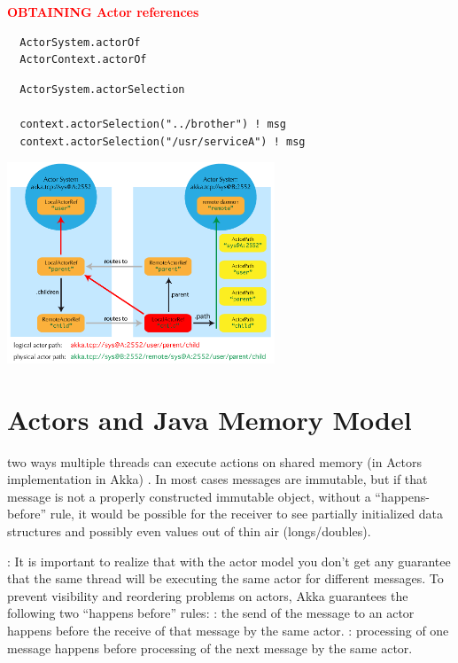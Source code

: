 \documentclass{note}
\begin{document}
\w \textcolor{red}{\bf{}OBTAINING Actor references}
  \bit
  \w {}
\begin{verbatim}
  ActorSystem.actorOf
  ActorContext.actorOf
\end{verbatim}
  \w {}
\begin{verbatim}
  ActorSystem.actorSelection

  context.actorSelection("../brother") ! msg
  context.actorSelection("/usr/serviceA") ! msg
\end{verbatim}
  \eit
\eit


\centerline{\includegraphics[width=8cm]{pics/remote-deployment}}

\section{Actors and Java Memory Model}
\bit
\w two ways multiple threads can execute actions on shared memory
  (in Actors implementation in Akka)
\bit
\w {}. In most cases
messages are immutable, but if that message is not a properly constructed
immutable object, without a ``happens-before'' rule, it would be
possible for the receiver to see partially initialized data structures and
possibly even values out of thin air (longs/doubles).

\w  {}: It is important to realize that with the actor model you don't get
any guarantee that the same thread will be executing the same actor for
different messages.
\eit
To prevent visibility and reordering problems on actors, Akka guarantees the following two ``happens before''
rules:
\bit
\w  {}: the send of the message to an actor happens before the receive of that message by the
same actor.
\w {}: processing of one message happens before processing of the next
message by the same actor. 
\eit
\eit
\end{document}
